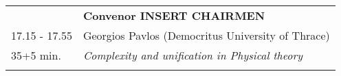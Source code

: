 \begin{longtable}{p{3cm}p{13cm}}
&\hfill {\bf Convenor INSERT CHAIRMEN }\\ 
17.15 - 17.55 & Georgios Pavlos (Democritus University of Thrace)\\ 
35+5 min. & {\it Complexity and unification in Physical theory}\\ 
 & \\ 
\end{longtable}

